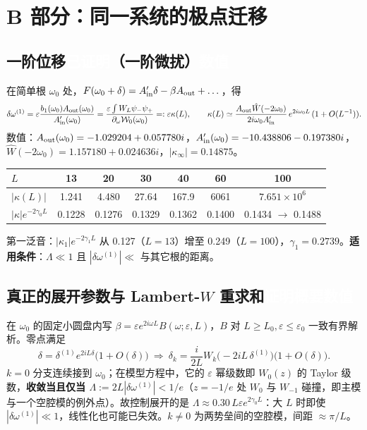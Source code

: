 \documentclass[11pt,a4paper,fontset=windows]{ctexart}
\newcommand{\tagbox}[2]{\begingroup\setlength{\fboxsep}{1.4pt}\colorbox{#1}{\textcolor{white}{\footnotesize\bfseries #2}}\endgroup}
\newcommand{\proven}{\tagbox{green!45!black}{已证明}}
\newcommand{\sketch}{\tagbox{teal!80!black}{证明概要}}
\newcommand{\numer}{\tagbox{orange!85!black}{数值}}
\theoremstyle{definition}
\theoremstyle{definition}
\newcommand{\eps}{\varepsilon}
\newcommand{\cW}{\mathcal W}
\newcommand{\Ain}{A_{\rm in}}
\newcommand{\Aout}{A_{\rm out}}
\begin{document}
\section{B 部分：同一系统的极点迁移}
\subsection[一阶位移]{一阶位移\enspace\proven（一阶微扰）\enspace\numer}
在简单根 $\omega_0$ 处，$F(\omega_0+\delta)=\Ain'\delta-\beta\Aout+\dots$，得
\[
\delta\omega^{(1)}=\eps\frac{b_1(\omega_0)\Aout(\omega_0)}{\Ain'(\omega_0)}=\frac{\eps\int W_L\psi_-\psi_+}{\partial_\omega\cW_0(\omega_0)}=:\eps\kappa(L),\qquad
\kappa(L)\simeq\frac{\Aout\hat W(-2\omega_0)}{2i\omega_0\Ain'}\,e^{2i\omega_0L}\,(1+O(L^{-1})).
\]
数值：$\Aout(\omega_0)=-1.029204+0.057780i$，$\Ain'(\omega_0)=-10.438806-0.197380i$，$\hat W(-2\omega_0)=1.157180+0.024636i$，$|\kappa_\infty|=0.14875$。
\begin{table}[h]
\centering\small
\begin{tabular}{@{}lcccccc@{}}
\toprule
$L$ & 13 & 20 & 30 & 40 & 60 & 100\\\midrule
$|\kappa(L)|$ & 1.241 & 4.480 & 27.64 & 167.9 & 6061 & $7.651\times10^6$\\
$|\kappa|e^{-2\gamma_0L}$ & 0.1228 & 0.1276 & 0.1329 & 0.1362 & 0.1400 & 0.1434 $\to$ 0.1488\\\bottomrule
\end{tabular}
\end{table}

\noindent 第一泛音：$|\kappa_1|e^{-2\gamma_1L}$ 从 0.127（$L=13$）增至 0.249（$L=100$），$\gamma_1=0.2739$。\textbf{适用条件}：$\Lambda\ll1$ 且 $|\delta\omega^{(1)}|\ll$ 与其它根的距离。

\subsection[\texorpdfstring{真正的展开参数与 Lambert-$W$ 重求和}{真正的展开参数与 Lambert-W 重求和}]{真正的展开参数与 Lambert-$W$ 重求和\enspace\sketch\enspace\numer}
在 $\omega_0$ 的固定小圆盘内写 $\beta=\eps e^{2i\omega L}B(\omega;\eps,L)$，$B$ 对 $L\ge L_0,\eps\le\eps_0$ 一致有界解析。零点满足
\[
\delta=\delta^{(1)}e^{2iL\delta}\bigl(1+O(\delta)\bigr)\ \Longrightarrow\ \delta_k=\frac{i}{2L}W_k\bigl(-2iL\,\delta^{(1)}\bigr)\bigl(1+O(\delta)\bigr).
\]
$k=0$ 分支连续接到 $\omega_0$；在模型方程中，它的 $\eps$ 幂级数即 $W_0(z)$ 的 Taylor 级数，\textbf{收敛当且仅当 $\Lambda:=2L|\delta\omega^{(1)}|<1/e$}（$z=-1/e$ 处 $W_0$ 与 $W_{-1}$ 碰撞，即主模与一个空腔模的例外点）。故控制展开的是 $\Lambda\approx0.30\,L\eps e^{2\gamma_0L}$：大 $L$ 时即使 $|\delta\omega^{(1)}|\ll1$，线性化也可能已失效。$k\ne0$ 为两势垒间的空腔模，间距 $\approx\pi/L$。
\end{document}
